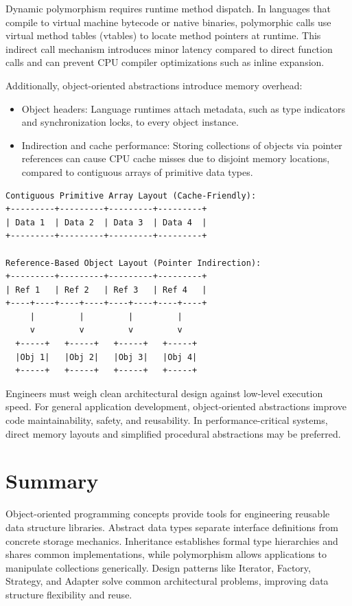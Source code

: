 \documentclass[12pt]{report}
\begin{document}
Dynamic polymorphism requires runtime method dispatch. In languages that compile to virtual machine bytecode or native binaries, polymorphic calls use virtual method tables (vtables) to locate method pointers at runtime. This indirect call mechanism introduces minor latency compared to direct function calls and can prevent CPU compiler optimizations such as inline expansion.

Additionally, object-oriented abstractions introduce memory overhead:

\begin{itemize}
    \item Object headers: Language runtimes attach metadata, such as type indicators and synchronization locks, to every object instance.
    \item Indirection and cache performance: Storing collections of objects via pointer references can cause CPU cache misses due to disjoint memory locations, compared to contiguous arrays of primitive data types.
\end{itemize}

\begin{verbatim}
Contiguous Primitive Array Layout (Cache-Friendly):
+---------+---------+---------+---------+
| Data 1  | Data 2  | Data 3  | Data 4  |
+---------+---------+---------+---------+

Reference-Based Object Layout (Pointer Indirection):
+---------+---------+---------+---------+
| Ref 1   | Ref 2   | Ref 3   | Ref 4   |
+----+----+----+----+----+----+----+----+
     |         |         |         |
     v         v         v         v
  +-----+   +-----+   +-----+   +-----+
  |Obj 1|   |Obj 2|   |Obj 3|   |Obj 4|
  +-----+   +-----+   +-----+   +-----+
\end{verbatim}

Engineers must weigh clean architectural design against low-level execution speed. For general application development, object-oriented abstractions improve code maintainability, safety, and reusability. In performance-critical systems, direct memory layouts and simplified procedural abstractions may be preferred.

\section{Summary}

Object-oriented programming concepts provide tools for engineering reusable data structure libraries. Abstract data types separate interface definitions from concrete storage mechanics. Inheritance establishes formal type hierarchies and shares common implementations, while polymorphism allows applications to manipulate collections generically. Design patterns like Iterator, Factory, Strategy, and Adapter solve common architectural problems, improving data structure flexibility and reuse.
\end{document}
